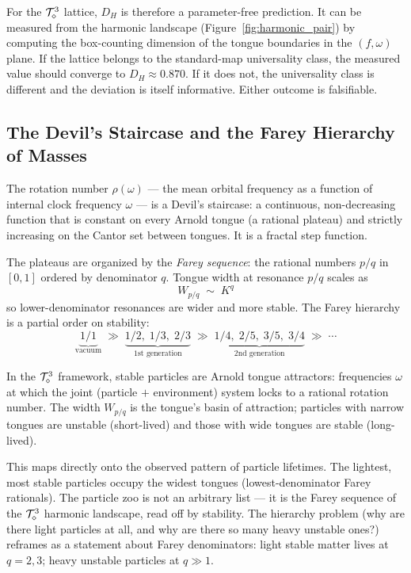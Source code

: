 For the $\mathcal{T}_\diamond^3$ lattice, $D_H$ is therefore a parameter-free
prediction.
It can be measured from the harmonic landscape (Figure~\ref{fig:harmonic_pair})
by computing the box-counting dimension of the tongue boundaries in the
$(f, \omega)$ plane.
If the lattice belongs to the standard-map universality class, the
measured value should converge to $D_H \approx 0.870$.
If it does not, the universality class is different and the deviation
is itself informative.
Either outcome is falsifiable.

\subsection{The Devil's Staircase and the Farey Hierarchy of Masses}
\label{subsec:devils_staircase}

The rotation number $\rho(\omega)$ --- the mean orbital frequency
as a function of internal clock frequency $\omega$ --- is a Devil's
staircase: a continuous, non-decreasing function that is constant on
every Arnold tongue (a rational plateau) and strictly increasing on
the Cantor set between tongues.
It is a fractal step function.

The plateaus are organized by the \emph{Farey sequence}: the rational
numbers $p/q$ in $[0,1]$ ordered by denominator $q$.
Tongue width at resonance $p/q$ scales as
\begin{equation}
    W_{p/q} \;\sim\; K^q
    \label{eq:tongue_width}
\end{equation}
so lower-denominator resonances are wider and more stable.
The Farey hierarchy is a partial order on stability:
\begin{equation}
    \underbrace{1/1}_{\text{vacuum}} \;\gg\;
    \underbrace{1/2,\; 1/3,\; 2/3}_{\text{1st generation}} \;\gg\;
    \underbrace{1/4,\; 2/5,\; 3/5,\; 3/4}_{\text{2nd generation}} \;\gg\; \cdots
\end{equation}

In the $\mathcal{T}_\diamond^3$ framework, stable particles are Arnold tongue
attractors: frequencies $\omega$ at which the joint (particle $+$
environment) system locks to a rational rotation number.
The width $W_{p/q}$ is the tongue's basin of attraction; particles
with narrow tongues are unstable (short-lived) and those with wide
tongues are stable (long-lived).

This maps directly onto the observed pattern of particle lifetimes.
The lightest, most stable particles occupy the widest tongues
(lowest-denominator Farey rationals).
The particle zoo is not an arbitrary list --- it is the Farey sequence
of the $\mathcal{T}_\diamond^3$ harmonic landscape, read off by stability.
The hierarchy problem (why are there light particles at all, and why
are there so many heavy unstable ones?) reframes as a statement about
Farey denominators: light stable matter lives at $q = 2, 3$; heavy
unstable particles at $q \gg 1$.

